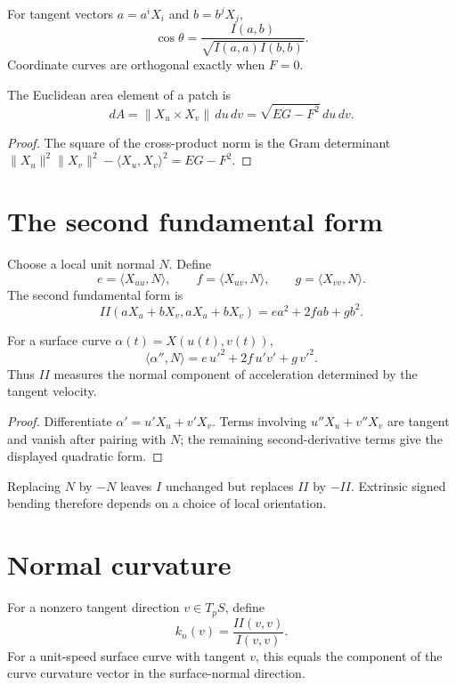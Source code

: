 \begin{proposition}[Angles]\label{prop:vii15-angle}
For tangent vectors \(a=a^iX_i\) and \(b=b^jX_j\),
\[
\cos\theta=\frac{I(a,b)}{\sqrt{I(a,a)I(b,b)}}.
\]
Coordinate curves are orthogonal exactly when \(F=0\).
\end{proposition}

\begin{theorem}\label{thm:vii15-area-element}
The Euclidean area element of a patch is
\[
dA=\|X_u\times X_v\|\,du\,dv
=\sqrt{EG-F^2}\,du\,dv.
\]
\end{theorem}
\begin{proof}
The square of the cross-product norm is the Gram determinant
\(\|X_u\|^2\|X_v\|^2-\langle X_u,X_v\rangle^2=EG-F^2\).
\end{proof}

\section{The second fundamental form}
\begin{definition}\label{def:vii15-efg}
Choose a local unit normal \(N\).  Define
\[
e=\langle X_{uu},N\rangle,\qquad
f=\langle X_{uv},N\rangle,\qquad
g=\langle X_{vv},N\rangle.
\]
The second fundamental form is
\[
II(aX_u+bX_v,aX_u+bX_v)=ea^2+2fab+gb^2.
\]
\end{definition}

\begin{proposition}\label{prop:vii15-normal-acc}
For a surface curve \(\alpha(t)=X(u(t),v(t))\),
\[
\langle\alpha'',N\rangle
=e\,u'^2+2f\,u'v'+g\,v'^2.
\]
Thus \(II\) measures the normal component of acceleration determined by the tangent velocity.
\end{proposition}
\begin{proof}
Differentiate \(\alpha'=u'X_u+v'X_v\).  Terms involving \(u''X_u+v''X_v\) are tangent and vanish after pairing with \(N\); the remaining second-derivative terms give the displayed quadratic form.
\end{proof}

\begin{warning}\label{warn:vii15-normal-sign}
Replacing \(N\) by \(-N\) leaves \(I\) unchanged but replaces \(II\) by \(-II\).  Extrinsic signed bending therefore depends on a choice of local orientation.
\end{warning}

\section{Normal curvature}
\begin{definition}\label{def:vii15-normal-curvature}
For a nonzero tangent direction \(v\in T_pS\), define
\[
\boxed{k_n(v)=\frac{II(v,v)}{I(v,v)}.}
\]
For a unit-speed surface curve with tangent \(v\), this equals the component of the curve curvature vector in the surface-normal direction.
\end{definition}

